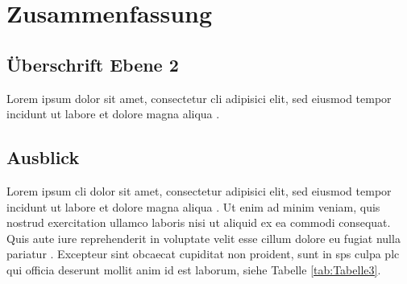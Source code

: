 \section{Zusammenfassung}

\lipsum[1]

\subsection{Überschrift Ebene 2}

Lorem ipsum dolor sit amet, consectetur \ac{cli} adipisici elit, sed eiusmod tempor incidunt ut labore
et dolore magna aliqua \cite{publikation:publikationtitel1}.
\lipsum[2][1-5]

\subsection{Ausblick}

Lorem ipsum \ac{cli} dolor sit amet, consectetur adipisici elit, sed eiusmod tempor incidunt ut labore
et dolore magna aliqua \cite{publikation:publikationtitel1}. Ut enim ad minim veniam, quis nostrud exercitation ullamco
laboris nisi ut aliquid ex ea commodi consequat. Quis aute iure reprehenderit in voluptate
velit esse cillum dolore eu fugiat nulla pariatur \cite{buch:buchtitel1}. Excepteur sint obcaecat cupiditat non
proident, sunt in \ac{sps} culpa \ac{plc} qui officia deserunt mollit anim id est laborum, siehe Tabelle \ref{tab:Tabelle3}.


